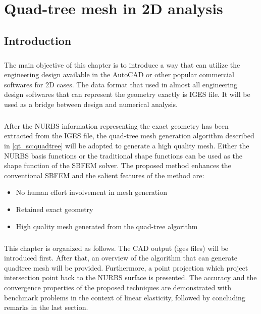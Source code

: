 \chapter{Quad-tree mesh in 2D analysis}
\label{qdt_sec:main}
\section{Introduction}
\paragraph{}
The main objective of this chapter is to introduce a way that can utilize the engineering design available in the AutoCAD or other popular commercial softwares for 2D cases.
The data format that used in almost all engineering design softwares that can represent the geometry exactly is IGES file.
It will be used as a bridge between design and numerical analysis.
%
\paragraph{}
After the NURBS information representing the exact geometry has been extracted from the IGES file, the quad-tree mesh generation algorithm described in \ref{qt_sc:quadtree} will be adopted to generate a high quality mesh.
Either the NURBS basis functions or the traditional shape functions can be used as the shape function of the SBFEM solver.
The proposed method enhances the conventional SBFEM and the salient features of the method are:
    \begin{itemize}
        \item No human effort involvement in mesh generation
        \item Retained exact geometry
        \item High quality mesh generated from the quad-tree algorithm
    \end{itemize}
\paragraph{}
This chapter is organized as follows.
The CAD output (iges files) will be introduced first.
After that, an overview of the algorithm that can generate quadtree mesh will be provided.
Furthermore, a point projection which project intersection point back to the NURBS surface is presented.
The accuracy and the convergence properties of the proposed techniques are demonstrated with benchmark problems in the context of linear elasticity, followed by concluding remarks in the last section.
\pagebreak

